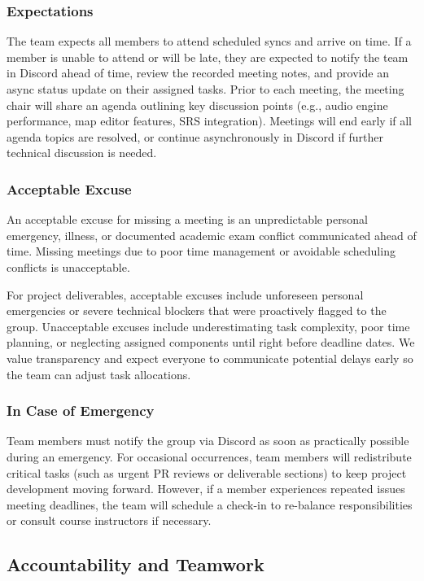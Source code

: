 \documentclass{article}
\begin{document}
\subsubsection*{Expectations}
The team expects all members to attend scheduled syncs and arrive on time. If a member is unable to attend or will be late, they are expected to notify the team in Discord ahead of time, review the recorded meeting notes, and provide an async status update on their assigned tasks. Prior to each meeting, the meeting chair will share an agenda outlining key discussion points (e.g., audio engine performance, map editor features, SRS integration). Meetings will end early if all agenda topics are resolved, or continue asynchronously in Discord if further technical discussion is needed.

\subsubsection*{Acceptable Excuse}
An acceptable excuse for missing a meeting is an unpredictable personal emergency, illness, or documented academic exam conflict communicated ahead of time. Missing meetings due to poor time management or avoidable scheduling conflicts is unacceptable.

For project deliverables, acceptable excuses include unforeseen personal emergencies or severe technical blockers that were proactively flagged to the group. Unacceptable excuses include underestimating task complexity, poor time planning, or neglecting assigned components until right before deadline dates. We value transparency and expect everyone to communicate potential delays early so the team can adjust task allocations.

\subsubsection*{In Case of Emergency}
Team members must notify the group via Discord as soon as practically possible during an emergency. For occasional occurrences, team members will redistribute critical tasks (such as urgent PR reviews or deliverable sections) to keep project development moving forward. However, if a member experiences repeated issues meeting deadlines, the team will schedule a check-in to re-balance responsibilities or consult course instructors if necessary.

\subsection*{Accountability and Teamwork}
\end{document}
